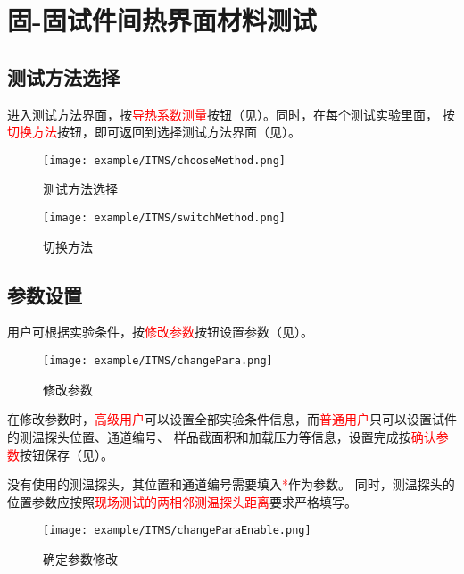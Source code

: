 \section{固-固试件间热界面材料测试}
\subsection{测试方法选择}
进入测试方法界面，按\textcolor{red}{导热系数测量}按钮（见）。同时，在每个测试实验里面，
按\textcolor{red}{切换方法}按钮，即可返回到选择测试方法界面（见）。
\begin{figure}[H]
	\centering
	\texttt{[image: example/ITMS/chooseMethod.png]}
	\caption{ 测试方法选择 \label{fig:exmp_itms_chooseMethod}}
\end{figure}

\begin{figure}[H]
	\centering
	\texttt{[image: example/ITMS/switchMethod.png]}
	\caption{ 切换方法 \label{fig:exmp_itms_switchMethod}}
\end{figure}

\subsection{参数设置}
用户可根据实验条件，按\textcolor{red}{修改参数}按钮设置参数（见）。
\begin{figure}[H]
	\centering
	\texttt{[image: example/ITMS/changePara.png]}
	\caption{ 修改参数 \label{fig:exmp_itms_changePara}}
\end{figure}
在修改参数时，\textcolor{red}{高级用户}可以设置全部实验条件信息，而\textcolor{red}{普通用户}只可以设置试件的测温探头位置、通道编号、
样品截面积和加载压力等信息，设置完成按\textcolor{red}{确认参数}按钮保存（见）。
\begin{note}
没有使用的测温探头，其位置和通道编号需要填入\textcolor{red}{*}作为参数。
同时，测温探头的位置参数应按照\textcolor{red}{现场测试的两相邻测温探头距离}要求严格填写。
\end{note}
\begin{figure}[H]
	\centering
	\texttt{[image: example/ITMS/changeParaEnable.png]}
	\caption{ 确定参数修改 \label{fig:exmp_itms_changeParaEnable}}
\end{figure}
